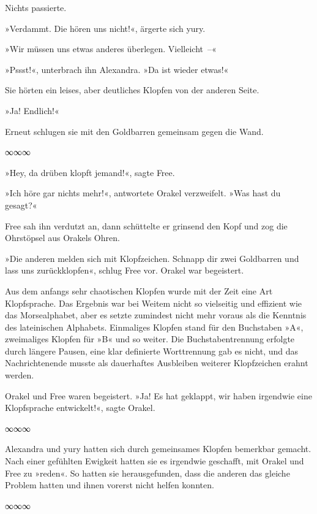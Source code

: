 Nichts passierte.

»Verdammt. Die hören uns nicht!«, ärgerte sich yury.

»Wir müssen uns etwas anderes überlegen. Vielleicht~–«

»Pssst!«, unterbrach ihn Alexandra. »Da ist wieder etwas!«

Sie hörten ein leises, aber deutliches Klopfen von der anderen Seite.

»Ja! Endlich!«

Erneut schlugen sie mit den Goldbarren gemeinsam gegen die Wand.

\begin{center}
    ∞∞∞
\end{center}

»Hey, da drüben klopft jemand!«, sagte Free.

»Ich höre gar nichts mehr!«, antwortete Orakel verzweifelt. »Was hast du gesagt?«

Free sah ihn verdutzt an, dann schüttelte er grinsend den Kopf und zog die Ohrstöpsel aus Orakels Ohren.

»Die anderen melden sich mit Klopfzeichen. Schnapp dir zwei Goldbarren und lass uns zurückklopfen«, schlug Free vor. Orakel war begeistert.

Aus dem anfangs sehr chaotischen Klopfen wurde mit der Zeit eine Art Klopfsprache. Das Ergebnis war bei Weitem nicht so vielseitig und effizient wie das Morsealphabet, aber es setzte zumindest nicht mehr voraus als die Kenntnis des lateinischen Alphabets. Einmaliges Klopfen stand für den Buchstaben »A«, zweimaliges Klopfen für »B« und so weiter. Die Buchstabentrennung erfolgte durch längere Pausen, eine klar definierte Worttrennung gab es nicht, und das Nachrichtenende musste als dauerhaftes Ausbleiben weiterer Klopfzeichen erahnt werden.

Orakel und Free waren begeistert. »Ja! Es hat geklappt, wir haben irgendwie eine Klopfsprache entwickelt!«, sagte Orakel.

\begin{center}
    ∞∞∞
\end{center}

Alexandra und yury hatten sich durch gemeinsames Klopfen bemerkbar gemacht. Nach einer gefühlten Ewigkeit hatten sie es irgendwie geschafft, mit Orakel und Free zu »reden«. So hatten sie herausgefunden, dass die anderen das gleiche Problem hatten und ihnen vorerst nicht helfen konnten.

\begin{center}
    ∞∞∞
\end{center}

